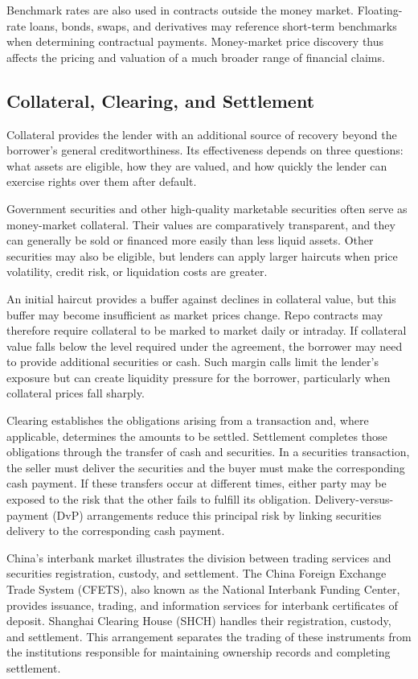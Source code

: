 Benchmark rates are also used in contracts outside the
money market. Floating-rate loans, bonds, swaps, and
derivatives may reference short-term benchmarks when
determining contractual payments. Money-market price
discovery thus affects the pricing and valuation of a
much broader range of financial claims.

\subsection{Collateral, Clearing, and Settlement}

Collateral provides the lender with an additional
source of recovery beyond the borrower's general
creditworthiness. Its effectiveness depends on three
questions: what assets are eligible, how they are
valued, and how quickly the lender can exercise rights
over them after default.

Government securities and other high-quality marketable securities often serve as money-market collateral. Their values are comparatively transparent, and they can generally be sold or financed more easily than less liquid assets. Other securities may also be eligible, but lenders can apply larger haircuts when price volatility, credit risk, or liquidation costs are greater.

An initial haircut provides a buffer against declines
in collateral value, but this buffer may become
insufficient as market prices change. Repo contracts
may therefore require collateral to be marked to
market daily or intraday. If collateral value falls
below the level required under the agreement, the
borrower may need to provide additional securities
or cash. Such margin calls limit the lender's exposure
but can create liquidity pressure for the borrower,
particularly when collateral prices fall sharply.

Clearing establishes the obligations arising from a
transaction and, where applicable, determines the
amounts to be settled. Settlement completes those
obligations through the transfer of cash and securities.
In a securities transaction, the seller must deliver
the securities and the buyer must make the corresponding
cash payment. If these transfers occur at different
times, either party may be exposed to the risk that
the other fails to fulfill its obligation. Delivery-versus-payment
(DvP) arrangements reduce this principal risk by
linking securities delivery to the corresponding
cash payment.

China's interbank market illustrates the division
between trading services and securities registration,
custody, and settlement. The China Foreign Exchange
Trade System (CFETS), also known as the National
Interbank Funding Center, provides issuance, trading,
and information services for interbank certificates
of deposit. Shanghai Clearing House (SHCH) handles
their registration, custody, and settlement. This
arrangement separates the trading of these instruments
from the institutions responsible for maintaining
ownership records and completing settlement.

